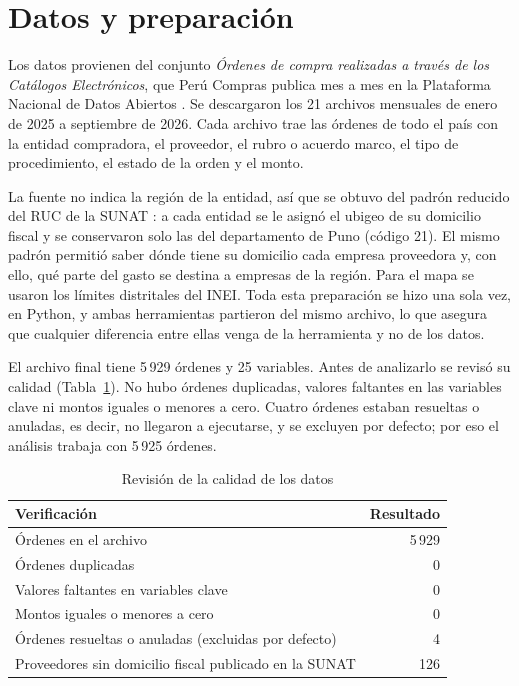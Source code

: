 \documentclass[12pt,a4paper]{article}
\begin{document}
\section{Datos y preparación}
Los datos provienen del conjunto \emph{Órdenes de compra realizadas a través de los Catálogos
Electrónicos}, que Perú Compras publica mes a mes en la Plataforma Nacional de Datos Abiertos
\citep{perucompras2026}. Se descargaron los 21 archivos mensuales de enero de 2025 a septiembre de 2026.
Cada archivo trae las órdenes de todo el país con la entidad compradora, el proveedor, el rubro o acuerdo
marco, el tipo de procedimiento, el estado de la orden y el monto.

La fuente no indica la región de la entidad, así que se obtuvo del padrón reducido del RUC de la SUNAT
\citep{sunat2026}: a cada entidad se le asignó el ubigeo de su domicilio fiscal y se conservaron solo las
del departamento de Puno (código 21). El mismo padrón permitió saber dónde tiene su domicilio cada empresa
proveedora y, con ello, qué parte del gasto se destina a empresas de la región. Para el mapa se usaron los
límites distritales del INEI. Toda esta preparación se hizo una sola vez, en Python, y ambas
herramientas partieron del mismo archivo, lo que asegura que cualquier diferencia entre ellas venga de la
herramienta y no de los datos.

El archivo final tiene 5\,929 órdenes y 25 variables. Antes de analizarlo se revisó su calidad
(Tabla~\ref{tab:calidad}). No hubo órdenes duplicadas, valores faltantes en las variables clave ni montos
iguales o menores a cero. Cuatro órdenes estaban resueltas o anuladas, es decir, no llegaron a
ejecutarse, y se excluyen por defecto; por eso el análisis trabaja con 5\,925 órdenes.

\begin{table}[H]\centering\small
\caption{Revisión de la calidad de los datos}\label{tab:calidad}
\begin{tabular}{lr}
\toprule
\textbf{Verificación} & \textbf{Resultado} \\ \midrule
Órdenes en el archivo & 5\,929 \\
Órdenes duplicadas & 0 \\
Valores faltantes en variables clave & 0 \\
Montos iguales o menores a cero & 0 \\
Órdenes resueltas o anuladas (excluidas por defecto) & 4 \\
Proveedores sin domicilio fiscal publicado en la SUNAT & 126 \\ \bottomrule
\end{tabular}
\end{table}
\end{document}

